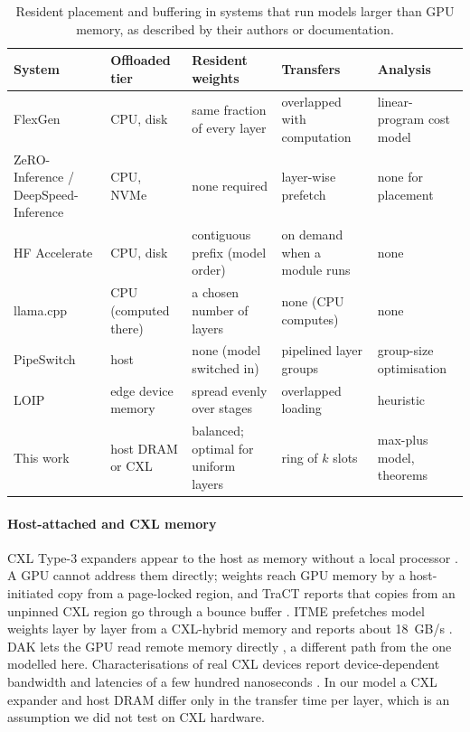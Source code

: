 \documentclass[final,5p,times,twocolumn]{elsarticle}
\theoremstyle{definition}
\begin{document}
\begin{table}[t]
\centering
\caption{Resident placement and buffering in systems that run models larger than GPU memory, as described by their authors or documentation.}
\label{tab:related}
\small
\begin{tabular}{p{3.0cm}p{2.6cm}p{3.6cm}p{3.4cm}p{3.0cm}}
\toprule
System & Offloaded tier & Resident weights & Transfers & Analysis\\
\midrule
FlexGen \cite{sheng2023flexgen} & CPU, disk & same fraction of every layer & overlapped with computation & linear-program cost model\\
ZeRO-Inference / DeepSpeed-Inference \cite{rajbhandari2021infinity,aminabadi2022deepspeedinference} & CPU, NVMe & none required & layer-wise prefetch & none for placement\\
HF Accelerate \cite{hf2024accelerate} & CPU, disk & contiguous prefix (model order) & on demand when a module runs & none\\
llama.cpp \cite{gerganov2023llamacpp} & CPU (computed there) & a chosen number of layers & none (CPU computes) & none\\
PipeSwitch \cite{bai2020pipeswitch} & host & none (model switched in) & pipelined layer groups & group-size optimisation\\
LOIP \cite{sun2025loip} & edge device memory & spread evenly over stages & overlapped loading & heuristic\\
This work & host DRAM or CXL & balanced; optimal for uniform layers & ring of $k$ slots & max-plus model, theorems\\
\bottomrule
\end{tabular}
\end{table}

\paragraph{Host-attached and CXL memory}
CXL Type-3 expanders appear to the host as memory without a local processor \cite{pond2023,tpp2023}. A GPU cannot address them directly; weights reach GPU memory by a host-initiated copy from a page-locked region, and TraCT reports that copies from an unpinned CXL region go through a bounce buffer \cite{yoon2025tract}. ITME prefetches model weights layer by layer from a CXL-hybrid memory and reports about 18~GB/s \cite{jang2026itme}. DAK lets the GPU read remote memory directly \cite{lin2026dak}, a different path from the one modelled here. Characterisations of real CXL devices report device-dependent bandwidth and latencies of a few hundred nanoseconds \cite{demystifying2023,directcxl2022}. In our model a CXL expander and host DRAM differ only in the transfer time per layer, which is an assumption we did not test on CXL hardware.
\end{document}

